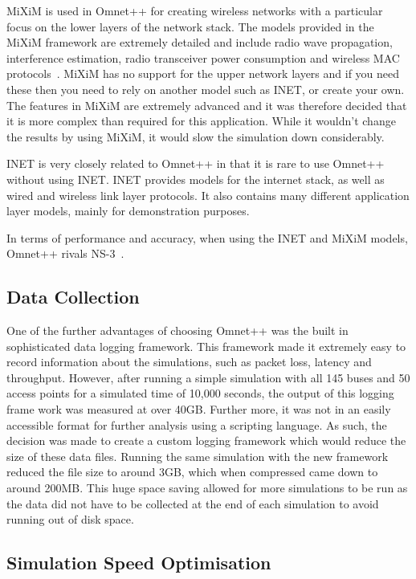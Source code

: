            MiXiM is used in Omnet++ for creating wireless networks with a particular focus on the lower layers of the network stack. The models provided in the MiXiM framework are extremely detailed and include radio wave propagation, interference estimation, radio transceiver power consumption and wireless MAC protocols~\cite{miximvision}. MiXiM has no support for the upper network layers and if you need these then you need to rely on another model such as INET, or create your own. The features in MiXiM are extremely advanced and it was therefore decided that it is more complex than required for this application. While it wouldn't change the results by using MiXiM, it would slow the simulation down considerably.

            INET is very closely related to Omnet++ in that it is rare to use Omnet++ without using INET. INET provides models for the internet stack, as well as wired and wireless link layer protocols. It also contains many different application layer models, mainly for demonstration purposes.  

            In terms of performance and accuracy, when using the INET and MiXiM models, Omnet++ rivals NS-3~\cite{networksimulatorcomparison}.


        \subsection{Data Collection}\label{simulation_simulator_options_data_collection}

            One of the further advantages of choosing Omnet++ was the built in sophisticated data logging framework. This framework made it extremely easy to record information about the simulations, such as packet loss, latency and throughput. However, after running a simple simulation with all 145 buses and 50 access points for a simulated time of 10,000 seconds, the output of this logging frame work was measured at over 40GB. Further more, it was not in an easily accessible format for further analysis using a scripting language. As such, the decision was made to create a custom logging framework which would reduce the size of these data files. Running the same simulation with the new framework reduced the file size to around 3GB, which when compressed came down to around 200MB. This huge space saving allowed for more simulations to be run as the data did not have to be collected at the end of each simulation to avoid running out of disk space. 

        \subsection{Simulation Speed Optimisation}\label{simulation_simulator_options_simulation_speed_optimisation}

